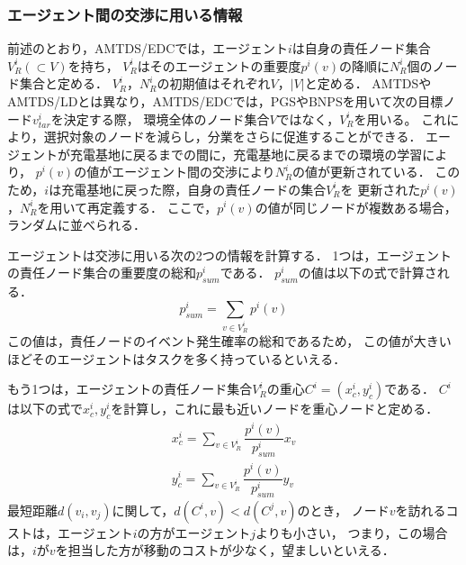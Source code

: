 \documentclass[12pt,a4j,twoside]{jarticle}
\begin{document}
  \subsubsection{エージェント間の交渉に用いる情報}\label{communicationInformation}
  前述のとおり，AMTDS/EDCでは，エージェント$i$は自身の責任ノード集合$V^i_R(\subset V)$を持ち，
  $V^i_R$はそのエージェントの重要度$p^i(v)$の降順に$N^i_R$個のノード集合と定める．
  $V^i_R$，$N^i_R$の初期値はそれぞれ$V$，$|V|$と定める．
  AMTDSやAMTDS/LDとは異なり，AMTDS/EDCでは，PGSやBNPSを用いて次の目標ノード$v^i_{tar}$を決定する際，
  環境全体のノード集合$V$ではなく，$V^i_R$を用いる。
  これにより，選択対象のノードを減らし，分業をさらに促進することができる．
  エージェントが充電基地に戻るまでの間に，充電基地に戻るまでの環境の学習により，
  $p^i(v)$の値がエージェント間の交渉により$N^i_R$の値が更新されている．
  このため，$i$は充電基地に戻った際，自身の責任ノードの集合$V^i_R$を
  更新された$p^i(v)$，$N^i_R$を用いて再定義する．
  ここで，$p^i(v)$の値が同じノードが複数ある場合，ランダムに並べられる．
  \par

  エージェントは交渉に用いる次の2つの情報を計算する．
  1つは，エージェントの責任ノード集合の重要度の総和$p^i_{sum}$である．
  $p^i_{sum}$の値は以下の式で計算される．
  \begin{equation}
    p^i_{sum} = \sum_{v \in V^i_R} p^i(v)
  \end{equation}
  この値は，責任ノードのイベント発生確率の総和であるため，
  この値が大きいほどそのエージェントはタスクを多く持っているといえる．
  \par

  もう1つは，エージェントの責任ノード集合$V^i_R$の重心$C^i = (x^i_c, y^i_c)$である．
  $C^i$は以下の式で$x^i_c, y^i_c$を計算し，これに最も近いノードを重心ノードと定める．
  \begin{eqnarray}
    x^i_c = \sum_{v \in V^i_R} \dfrac{p^i(v)}{p^i_{sum}}x_v \\
    y^i_c = \sum_{v \in V^i_R} \dfrac{p^i(v)}{p^i_{sum}}y_v
  \end{eqnarray}
  最短距離$d(v_i, v_j)$に関して，$d(C^i, v) < d(C^j, v)$のとき，
  ノード$v$を訪れるコストは，エージェント$i$の方がエージェント$j$よりも小さい，
  つまり，この場合は，$i$が$v$を担当した方が移動のコストが少なく，望ましいといえる．
\end{document}
